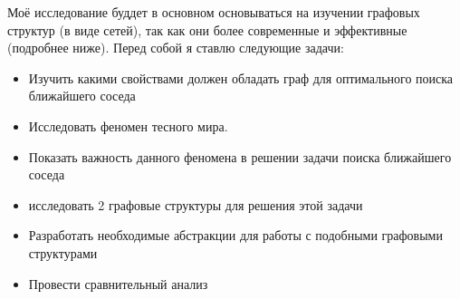 \begin{justify}
    Моё исследование буддет в основном основываться на изучении
    графовых структур (в виде сетей), так как они более современные
    и эффективные (подробнее ниже). Перед собой я ставлю следующие 
    задачи:
    \begin{itemize}
        \item Изучить какими свойствами должен обладать граф для оптимального
        поиска ближайшего соседа
        \item Исследовать феномен тесного мира.
        \item Показать важность данного феномена в решении задачи поиска ближайшего соседа
        \item исследовать 2 графовые структуры для решения этой задачи
        \item Разработать необходимые абстракции для работы с подобными
        графовыми структурами
        \item Провести сравнительный анализ
    \end{itemize}    
    
    
\end{justify}


